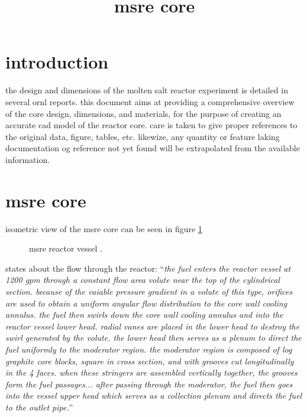 \documentclass{article}
\title{msre core}
\author{}
\date{}
\begin{document}
\begin{preview}
\maketitle

\section{introduction}
the design and dimensions of the molten salt reactor experiment is detailed in several ornl reports. this document aims at providing a comprehensive overview of the core design, dimensions, and materials, for the purpose of creating an accurate cad model of the reactor core.
care is taken to give proper references to the original data, figure, tables, etc. likewize, any quantity or feature laking documentation og reference not yet found will be extrapolated from the available information.



\section{msre core}
isometric view of the msre core can be seen in figure \ref{3229-fig1}
\begin{figure}[H]
  \centering
  \caption{msre reactor vessel \parencite[figure 1]{ornl-tm-3229}.}
  \label{3229-fig1}
\end{figure}

\textcite[page 1]{ornl-tm-3229} states about the flow through the reactor: \enquote{\textit{the fuel enters the reactor vessel at 1200 gpm through a constant flow area volute near the top of the cylindrical section. because of the vaiable pressure gradient in a volute of this type, orifices are used to obtain a uniform angular flow distribution to the core wall cooling annulus. the fuel then swirls down the core wall cooling annulus and into the reactor vessel lower head. radial vanes are placed in the lower head to destroy the swirl generated by the volute. the lower head then serves as a plenum to direct the fuel uniformly to the moderator region. the moderator region is composed of log graphite core blocks, square in cross section, and with grooves cut longitudinally in the 4 faces. when these stringers are assembled vertically together, the grooves form the fuel passages... after passing through the moderator, the fuel then goes into the vessel upper head which serves as a collection plenum and directs the fuel to the outlet pipe.}}



\end{preview}
\end{document}
